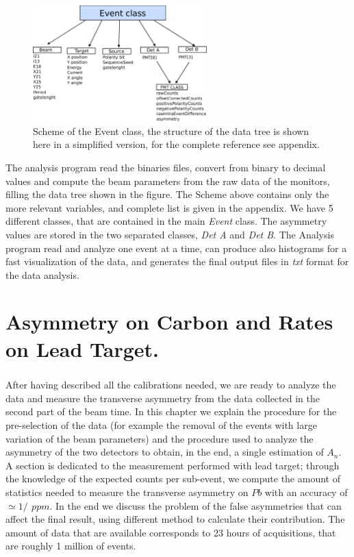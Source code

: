 \begin{figure}[hbtp]
\centering
\includegraphics[width = 0.6\textwidth]{Analysis/EventClass.pdf}
\caption{Scheme of the Event class, the structure of the data tree is shown here in a simplified version, for the complete reference see appendix.}
\label{fig:DataTree}
\end{figure}

The analysis program read the binaries files, convert from binary to decimal values and compute the beam parameters from the raw data of the monitors,   filling the data tree shown in the figure. The Scheme above contains only the more relevant variables, and complete list is given in the appendix. We have 5 different classes, that are contained in the main \textit{Event} class. The asymmetry values are stored in the two separated classes, \textit{Det A} and \textit{Det B}. The Analysis program read and analyze one event at a time, can produce also histograms for a fast visualization of the data, and generates the final output files in \textit{txt} format for the data analysis.  

\chapter{Asymmetry on Carbon and Rates on Lead Target.}

\paragraph{}
After having described all the calibrations needed, we are ready to analyze the data and measure the transverse asymmetry from the data collected in the second part of the beam time. In this chapter we explain the procedure for the pre-selection of the data (for example the removal of the events with large variation of the beam parameters) and the procedure used to analyze the asymmetry of the two detectors to obtain, in the end, a single estimation of $A_{n}$. A section is dedicated to the measurement performed with lead target; through the knowledge of the expected counts per sub-event, we compute the amount of statistics needed to measure the transverse asymmetry on $Pb$ with an accuracy of $ \simeq 1/\ \, ppm$. In the end we discuss the problem of the false asymmetries that can affect the final result, using different method to calculate their contribution.
The amount of data that are available corresponds to 23 hours of acquisitions, that are roughly 1 million of events. 
 
